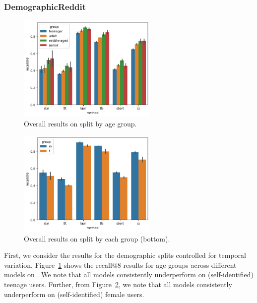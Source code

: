 \subsubsection{DemographicReddit}
\begin{figure}[h]
    \centering
    \includegraphics[width=0.6\textwidth]{stylometryExtensions/figures/demo/fixeddelta_demographics_age_groupwise.png}
    \caption{Overall results on \DSagefixed{} split by age group. }
    \label{fig:demographic_fixed:age}
\end{figure}
\begin{figure}[h]
    \centering
    \includegraphics[width=0.6\textwidth]{stylometryExtensions/figures/demo/fixeddelta_demographics_gender_groupwise.png}
    \caption{Overall results on \DSgenderfixed{} split by each group (bottom).}
    \label{fig:demographic_fixed:gender}
\end{figure}
First, we consider the results for the demographic splits controlled for temporal variation.
Figure~\ref{fig:demographic_fixed:age} shows the recall@8 results for age groups across different models on \DSagefixed{}.
We note that all models consistently underperform on (self-identified) teenage users.
Further, from Figure~\ref{fig:demographic_fixed:gender}, we note that all models consistently underperform on (self-identified) female users.

